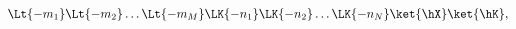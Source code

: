 \begin{equation}
%
\Lt{-m_1} \Lt{-m_2} \ldots \Lt{-m_M} 
\LK{-n_1} \LK{-n_2} \ldots \LK{-n_N} \ket{\hX}\ket{\hK},
%
\label{eq:basis}
\end{equation}

